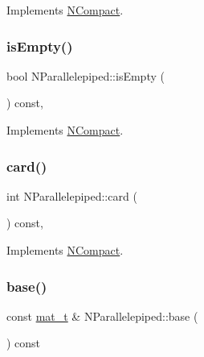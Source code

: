 Implements \mbox{\hyperlink{class_n_compact_a387e86914973c69b292782f640368680}{N\+Compact}}.

\mbox{\label{class_n_parallelepiped_a7c4271e0cd8678b6904b1f25d116cd57}} 
\subsubsection{\texorpdfstring{isEmpty()}{isEmpty()}}
{\footnotesize\ttfamily bool N\+Parallelepiped\+::is\+Empty (\begin{DoxyParamCaption}{ }\end{DoxyParamCaption}) const\hspace{0.3cm}{\ttfamily [override]}, {\ttfamily [virtual]}}



Implements \mbox{\hyperlink{class_n_compact_a574764d7ac4fe2393a739b67bf57a7f1}{N\+Compact}}.

\mbox{\label{class_n_parallelepiped_a57517e96bd3bc757cfa4e4d1d2768450}} 
\subsubsection{\texorpdfstring{card()}{card()}}
{\footnotesize\ttfamily int N\+Parallelepiped\+::card (\begin{DoxyParamCaption}{ }\end{DoxyParamCaption}) const\hspace{0.3cm}{\ttfamily [override]}, {\ttfamily [virtual]}}



Implements \mbox{\hyperlink{class_n_compact_a816bb4976567a7bfed57763ce717b685}{N\+Compact}}.

\mbox{\label{class_n_parallelepiped_a59a297106e5f9a9d8cc672dbe685eced}} 
\subsubsection{\texorpdfstring{base()}{base()}}
{\footnotesize\ttfamily const \mbox{\hyperlink{_n_p_matrix_8h_a44dfb60c1e03b44e98a332fb2ae71947}{mat\+\_\+t}} \& N\+Parallelepiped\+::base (\begin{DoxyParamCaption}{ }\end{DoxyParamCaption}) const}


